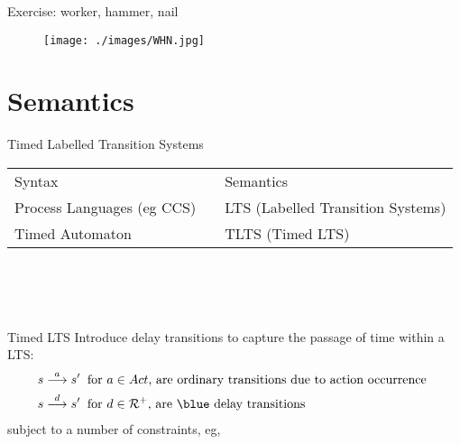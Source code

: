 \documentclass{beamer}
\def\dgold#1{{\darkgoldenrod #1}}
\def\dkb#1{{\blue #1}}
\def\R{\mathcal{R}}
\begin{document}
\begin{slide}{Exercise: worker, hammer, nail}
\small

\begin{figure}[htb]
  \centering
  \texttt{[image: ./images/WHN.jpg]}\\
\end{figure}
\end{slide}

\section{Semantics}


\begin{slide}{Timed Labelled Transition Systems}
\small
\begin{tabular}{lc@{~~}l}
\toprule 
\dgold{Syntax} && \dgold{Semantics}\\
\cmidrule(lr){1-3}
Process Languages (eg CCS) &  & LTS (Labelled Transition Systems)\\
\dkb{Timed Automaton} &  & TLTS (Timed LTS) \\
\bottomrule
\end{tabular}
~\\
~\\
~\\
\pause

\begin{block}{Timed LTS}
Introduce \dkb{delay transitions} to capture the passage of time within a LTS:
\begin{align*}
s \tran{a} s' & \;\; \text{for $a \in Act$, are ordinary transitions due to action occurrence }\\
s \tran{d} s' &\; \;  \text{for $d \in \R^+$, are \dkb{delay} transitions}
\end{align*}
subject to a number of constraints, eg, 
\end{block}
\end{slide}
\end{document}
